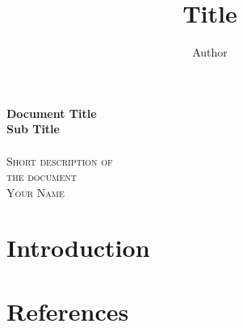 \documentclass[12pt,a4paper]{article}
\title{ Title }
\author{ Author }
\begin{document}
\begin{center}
    \huge{\textbf{ Document Title }} \\
    \huge{\textbf{ Sub Title }}\\
    \hspace{200pt}\\
    \textsc{ Short description of } \\
    \textsc{ the document }
    \vspace{280pt}\\
    \textsc{ Your Name }
\end{center}

\newpage
\tableofcontents
\newpage

\section{Introduction}

\newpage
\section{References}
\end{document}
